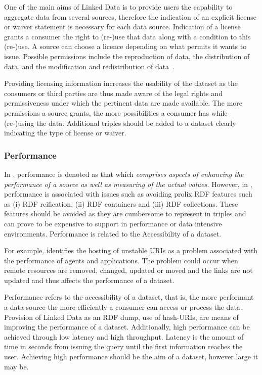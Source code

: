 \begin{definition}[Licensing]
One of the main aims of Linked Data is to provide users the capability to aggregate data from several sources, therefore the indication of an explicit license or waiver statement is necessary for each data source.
Indication of a license grants a consumer the right to (re-)use that data along with a condition to this (re-)use.
A source can choose a licence depending on what permits it wants to issue. 
Possible permissions include the reproduction of data, the distribution of data, and the modification and redistribution of data~\cite{Miller}.
\end{definition}

Providing licensing information increases the usability of the dataset as the consumers or third parties are thus made aware of the legal rights and permissiveness under which the pertinent data are made available.
The more permissions a source grants, the more possibilities a consumer has while (re-)using the data. 
Additional triples should be added to a dataset clearly indicating the type of license or waiver. 

\subsubsection{Performance}
In \cite{Flemming}, performance is denoted as that which \emph{comprises aspects of enhancing the performance of a source as well as measuring of the actual values.} 
However, in \cite{Hogan:2012}, performance is associated with issues such as avoiding prolix RDF features such as (i) RDF reification, (ii) RDF containers and (iii) RDF collections. 
These features should be avoided as they are cumbersome to represent in triples and can prove to be expensive to support in performance or data intensive environments.
Performance is related to the Accessibility of a dataset.

For example, \cite{Hogan:2012} identifies the hosting of unstable URIs as a problem associated with the performance of agents and applications. 
The problem could occur when remote resources are removed, changed, updated or moved and the links are not updated and thus affects the performance of a dataset. 

\begin{definition}[Performance]
Performance refers to the accessibility of a dataset, that is, the more performant a data source the more efficiently a consumer can access or process the data. 
Provision of Linked Data as an RDF dump, use of hash-URIs, are means of improving the performance of a dataset. 
Additionally, high performance can be achieved through low latency and high throughput.
Latency is the amount of time in seconds from issuing the query until the first information reaches the user.
Achieving high performance should be the aim of a dataset, however large it may be. 
\end{definition}

